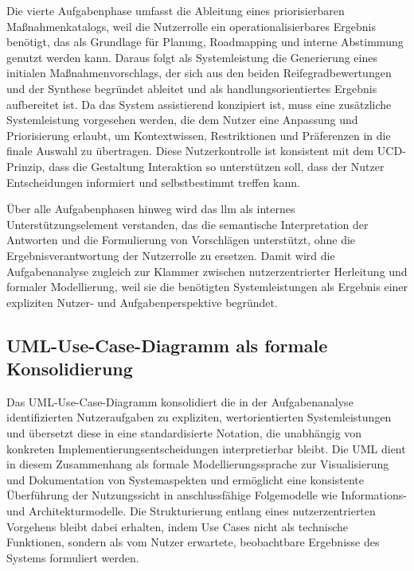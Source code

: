 Die vierte Aufgabenphase umfasst die Ableitung eines priorisierbaren Maßnahmenkatalogs, weil die Nutzerrolle ein operationalisierbares Ergebnis benötigt, das als Grundlage für Planung, Roadmapping und interne Abstimmung genutzt werden kann.
Daraus folgt als Systemleistung die Generierung eines initialen Maßnahmenvorschlags, der sich aus den beiden Reifegradbewertungen und der Synthese begründet ableitet und als handlungsorientiertes Ergebnis aufbereitet ist.
Da das System assistierend konzipiert ist, muss eine zusätzliche Systemleistung vorgesehen werden, die dem Nutzer eine Anpassung und Priorisierung erlaubt, um Kontextwissen, Restriktionen und Präferenzen in die finale Auswahl zu übertragen. \cite{iso9241_210_2019}
Diese Nutzerkontrolle ist konsistent mit dem UCD-Prinzip, dass die Gestaltung Interaktion so unterstützen soll, dass der Nutzer Entscheidungen informiert und selbstbestimmt treffen kann. \cite{normanDraper1986}

Über alle Aufgabenphasen hinweg wird das \gls{llm} als internes Unterstützungselement verstanden, das die semantische Interpretation der Antworten und die Formulierung von Vorschlägen unterstützt, ohne die Ergebnisverantwortung der Nutzerrolle zu ersetzen.
Damit wird die Aufgabenanalyse zugleich zur Klammer zwischen nutzerzentrierter Herleitung und formaler Modellierung, weil sie die benötigten Systemleistungen als Ergebnis einer expliziten Nutzer- und Aufgabenperspektive begründet. \cite{iso9241_210_2019}

\subsection{UML-Use-Case-Diagramm als formale Konsolidierung}
Das UML-Use-Case-Diagramm konsolidiert die in der Aufgabenanalyse identifizierten Nutzeraufgaben zu expliziten, wertorientierten Systemleistungen und übersetzt diese in eine standardisierte Notation, die unabhängig von konkreten Implementierungsentscheidungen interpretierbar bleibt. \cite{jacobson_usecase3_2024}
Die UML dient in diesem Zusammenhang als formale Modellierungssprache zur Visualisierung und Dokumentation von Systemaspekten und ermöglicht eine konsistente Überführung der Nutzungssicht in anschlussfähige Folgemodelle wie Informations- und Architekturmodelle. \cite{omg_uml251_about}
Die Strukturierung entlang eines nutzerzentrierten Vorgehens bleibt dabei erhalten, indem Use Cases nicht als technische Funktionen, sondern als vom Nutzer erwartete, beobachtbare Ergebnisse des Systems formuliert werden. \cite{iso9241_210_2019_sample,jacobson_usecase3_2024}

